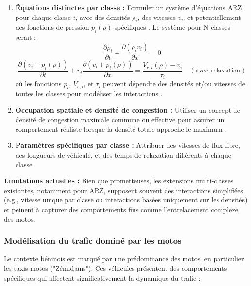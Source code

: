\begin{enumerate}
    \item \textbf{Équations distinctes par classe :} Formuler un système d'équations ARZ pour chaque classe $i$, avec des densités $\rho_i$, des vitesses $v_i$, et potentiellement des fonctions de pression $p_i(\rho)$ spécifiques \cite{FanWork2015, ColomboMarcellini2020}. Le système pour N classes serait :
    \begin{equation}
    \frac{\partial \rho_i}{\partial t} + \frac{\partial (\rho_i v_i)}{\partial x} = 0
    \end{equation}
    \begin{equation}
    \frac{\partial (v_i + p_i(\rho))}{\partial t} + v_i \frac{\partial (v_i + p_i(\rho))}{\partial x} = \frac{V_{e,i}(\rho) - v_i}{\tau_i} \quad (\text{avec relaxation})
    \end{equation}
    où les fonctions $p_i$, $V_{e,i}$, et $\tau_i$ peuvent dépendre des densités et/ou vitesses de toutes les classes pour modéliser les interactions \cite{FanWork2015, ColomboMarcellini2020, WongWong2002, BenzoniGavageColombo2003}.
    \item \textbf{Occupation spatiale et densité de congestion :} Utiliser un concept de densité de congestion maximale commune ou effective pour assurer un comportement réaliste lorsque la densité totale approche le maximum \cite{FanWork2015}.
    \item \textbf{Paramètres spécifiques par classe :} Attribuer des vitesses de flux libre, des longueurs de véhicule, et des temps de relaxation différents à chaque classe.
\end{enumerate}

\textbf{Limitations actuelles :} Bien que prometteuses, les extensions multi-classes existantes, notamment pour ARZ, supposent souvent des interactions simplifiées (e.g., vitesse unique par classe ou interactions basées uniquement sur les densités) et peinent à capturer des comportements fins comme l'entrelacement complexe des motos.

\subsubsection{Modélisation du trafic dominé par les motos}
Le contexte béninois est marqué par une prédominance des motos, en particulier les taxis-motos ("Zémidjans"). Ces véhicules présentent des comportements spécifiques qui affectent significativement la dynamique du trafic :

